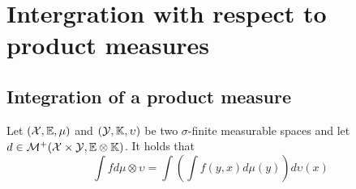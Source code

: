\section[Lecture 3]{Intergration with respect to product measures} %
\label{sec:lecture_3}
\subsection{Integration of a product measure} %
\label{sub:integration_of_a_product_measure}
\begin{them}
Let \(({\mathcal{X}},{\mathbb{E}},\mu)\) and \((\mathcal{Y},{\mathbb{K}},\upsilon)\) be two \(\sigma\)-finite measurable spaces and let \(d\in \mathcal{M}^+({\mathcal{X}}\times\mathcal{Y},{\mathbb{E}}\otimes{\mathbb{K}})\). It holds that
\[
  \int fd\mu\otimes \upsilon=\int\left(\int f(y,x)d\mu(y)\right)d\upsilon(x)
\]

\end{them}
